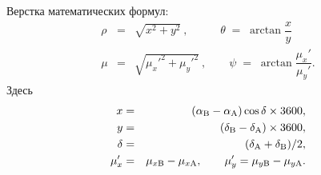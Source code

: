 \documentclass[
 aps, pra,
 amsmath,amssymb,
 11pt,
 final,
tightenlines,
 twoside,
 twocolumn,
 nofloats,
nofootinbib,
 superscriptaddress,
showkeys,
showkeywords,
 ]
{revtex4-2}
\begin{document}
Верстка математических формул:
\begin{eqnarray}
\rho&=&\sqrt{x^2+y^2}~,~~~\, \qquad \theta\;=\;\arctan\dfrac{x}{y} \nonumber \\
\mu&=&\sqrt{\mu_{x}'^2+\mu_{y}'^2}~, \qquad
\psi\;=\;\arctan\dfrac{\mu_{x}'}{\mu_{y}'}. \nonumber
\end{eqnarray}
Здесь
\begin{eqnarray}
x&=&(\alpha_{\rm B}-\alpha_{\rm A})\cos{\delta}\times3600,\nonumber\\
y&=&(\delta_{\rm B}-\delta_{\rm A})\times3600,\nonumber\\
\delta&=&(\delta_{\rm A}+\delta_{\rm B})/2,\nonumber\\
\mu_{x}'&=&\mu_{x{\rm B}}-\mu_{x{\rm A}},\nonumber
\qquad\mu_{y}'=\mu_{y{\rm B}}-\mu_{y{\rm A}}\nonumber.
\end{eqnarray}
\end{document}
